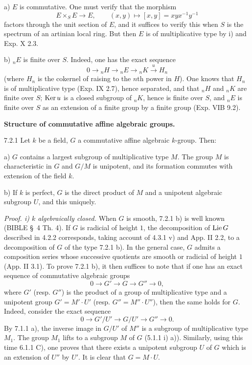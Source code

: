 \noindent a) $E$ is commutative. One must verify that the morphism
\[
E\times_S E\longrightarrow E,\qquad(x,y)\longmapsto[x,y]=xyx^{-1}y^{-1}
\]
factors through the unit section of $E$, and it suffices to verify this when $S$ is the spectrum of an artinian local ring. But then $E$ is of multiplicative type by i) and Exp. X 2.3.

\noindent b) ${}_nE$ is finite over $S$. Indeed, one has the exact sequence
\[
0\longrightarrow{}_nH\longrightarrow{}_nE\longrightarrow{}_nK\xrightarrow{u}H_n
\]
(where $H_n$ is the cokernel of raising to the $n$th power in $H$). One knows that $H_n$ is of multiplicative type (Exp. IX 2.7), hence separated, and that ${}_nH$ and ${}_nK$ are finite over $S$; $\operatorname{Ker} u$ is a closed subgroup of ${}_nK$, hence is finite over $S$, and ${}_nE$ is finite over $S$ as an extension of a finite group by a finite group (Exp. VIB 9.2).

\label{XVII.7.2}\textbf{Structure of commutative affine algebraic groups.}
\begin{theorem}{7.2.1}\label{XVII.7.2.1}
Let $k$ be a field, $G$ a commutative affine algebraic $k$-group. Then:

\noindent a) $G$ contains a largest subgroup of multiplicative type $M$. The group $M$ is characteristic in $G$ and $G/M$ is unipotent, and its formation commutes with extension of the field $k$.

\noindent b) If $k$ is perfect, $G$ is the direct product of $M$ and a unipotent algebraic subgroup $U$, and this uniquely.
\end{theorem}
\par\noindent\emph{Proof. i) $k$ algebraically closed.}
When $G$ is smooth, 7.2.1 b) is well known (BIBLE \S\ 4 Th. 4). If $G$ is radicial of height $1$, the decomposition of $\operatorname{Lie} G$ described in 4.2.2 corresponds, taking account of 4.3.1 v) and App. II 2.2, to a decomposition of $G$ of the type 7.2.1 b). In the general case, $G$ admits a composition series whose successive quotients are smooth or radicial of height $1$ (App. II 3.1). To prove 7.2.1 b), it then suffices to note that if one has an exact sequence of commutative algebraic groups
\[
0\longrightarrow G'\longrightarrow G\longrightarrow G''\longrightarrow0,
\]
where $G'$ (resp. $G''$) is the product of a group of multiplicative type and a unipotent group $G'=M'\cdot U'$ (resp. $G''=M''\cdot U''$), then the same holds for $G$. Indeed, consider the exact sequence
\[
0\longrightarrow G'/U'\longrightarrow G/U'\longrightarrow G''\longrightarrow0.
\]
By 7.1.1 a), the inverse image in $G/U'$ of $M''$ is a subgroup of multiplicative type $M_1$. The group $M_1$ lifts to a subgroup $M$ of $G$ (5.1.1 i) a)). Similarly, using this time 6.1.1 C), one proves that there exists a unipotent subgroup $U$ of $G$ which is an extension of $U''$ by $U'$. It is clear that $G=M\cdot U$.

